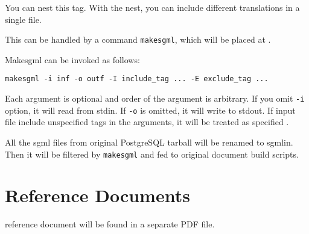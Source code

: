 	You can nest this tag. With the nest, you can include different translations in a single file.

	This can be handled by a command {\tt makesgml}, which will be placed at
	.

	Makesgml can be invoked as follows:

	\begin{lstlisting}
makesgml -i inf -o outf -I include_tag ... -E exclude_tag ...
	\end{lstlisting}

	Each argument is optional and order of the argument is arbitrary.
	If you omit {\tt -i} option, it will read from stdin.
	If {\tt -o} is omitted, it will write to stdout.
	If input file include unspecified tags in the arguments, it will be treated as specified
	.

	All the sgml files from original PostgreSQL tarball will be renamed to sgmlin.
	Then it will be filtered by {\tt makesgml} and fed to original document build scripts.

\section{\XC{} Reference Documents}

	\XC{} reference document will be found in a separate PDF file.

